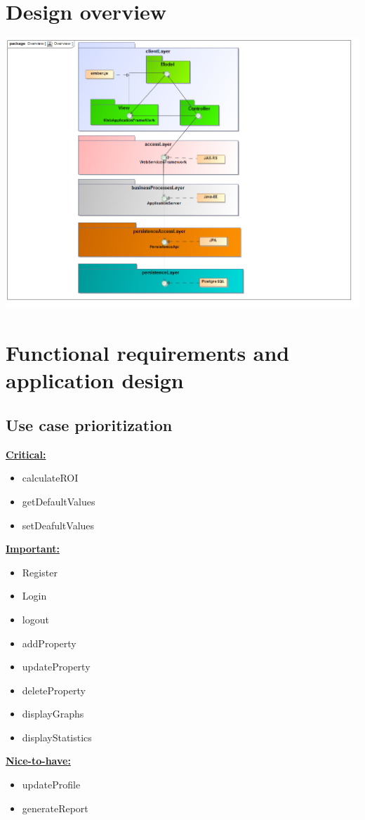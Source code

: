 \documentclass[a4paper,12pt]{article}
\begin{document}
\section{Design overview}
\includegraphics[width=1\textwidth]{./Images/Overview.png}

\newpage
\section{Functional requirements and application design}

\subsection{Use case prioritization}
 \underline{\textbf{Critical:}}
	\begin{itemize}
		\item calculateROI
		\item getDefaultValues
		\item setDeafultValues
	\end{itemize}
\underline{\textbf{Important:}}
	\begin{itemize}
		\item Register
		\item Login
		\item logout
		\item addProperty
		\item updateProperty	
		\item deleteProperty
		\item displayGraphs
		\item displayStatistics	
	\end{itemize}
\underline{\textbf{Nice-to-have:}}
	\begin{itemize}
		\item updateProfile
		\item generateReport	
	\end{itemize}
\end{document}
